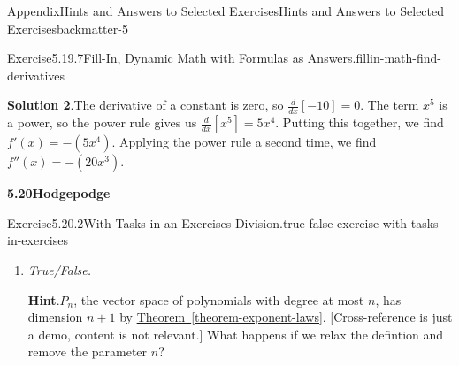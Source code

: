 \documentclass[oneside,10pt,]{book}
\newcommand{\blocktitlefont}{\relax}
\newcommand{\xreffont}{\relax}
\newlength{\fillinmaxwidth}
\newlength{\fillincontract}
\newlength{\charmaxwidth}\setlength{\charmaxwidth}{0.5em}
\newlength{\charminwidth}\setlength{\charminwidth}{0.1em}
\newlength{\fillinheight}
\newcommand{\fillintext}[1]{%
\setlength{\fillinmaxwidth}{#1\charmaxwidth}%
\setlength{\fillincontract}{#1\charminwidth}%
\setlength{\fillinheight}{\baselineskip}\addtolength{\fillinheight}{1.2pt}%
\strut\nobreak\leaders\vbox{\hrule width 0.3pt height 0.3pt \vskip -1.2pt}\hskip 1\fillinmaxwidth minus \fillincontract\nobreak\strut%
}
\newcommand{\lititle}[1]{{\slshape#1}}
\numberwithin{equation}{section}
\begin{document}
\begin{solutions-chapter}{Appendix}{Hints and Answers to Selected Exercises}{}{Hints and Answers to Selected Exercises}{}{}{backmatter-5}
\begin{divisionsolution}{Exercise}{5.19.7}{Fill-In, Dynamic Math with Formulas as Answers.}{fillin-math-find-derivatives}
\par\smallskip%
\noindent\textbf{\blocktitlefont Solution 2}.\hypertarget{fillin-math-find-derivatives-4-back}{}\quad{}The derivative of a constant is zero, so \(\frac{d}{dx}[-10]=0\). The term \(x^{5}\) is a power, so the power rule gives us \(\frac{d}{dx}[x^{5}]=5x^{4}\). Putting this together, we find \(f'(x)=-\left(5 x^{4}\right)\). Applying the power rule a second time, we find \(f''(x)=-\left(20 x^{3}\right)\).%
\end{divisionsolution}%
%
\par\medskip
\noindent\textbf{\Large{}5.20\space\textperiodcentered\space{}Hodgepodge}
\begin{divisionsolution}{Exercise}{5.20.2}{With Tasks in an Exercises Division.}{true-false-exercise-with-tasks-in-exercises}%
\begin{enumerate}[font=\bfseries,label=(\alph*),ref=\alph*]%
\item[(a)]\lititle{True\slash{}False.}\par%
\par\smallskip%
\noindent\textbf{\blocktitlefont Hint}.\hypertarget{true-false-task-in-exercises-4-back}{}\quad{}\(P_n\), the vector space of polynomials with degree at most \(n\), has dimension \(n+1\) by \hyperref[theorem-exponent-laws]{Theorem~{\xreffont\ref{theorem-exponent-laws}}}.  [Cross-reference is just a demo, content is not relevant.]  What happens if we relax the defintion and remove the parameter \(n\)?%

\end{enumerate}
\end{divisionsolution}
\end{solutions-chapter}
\end{document}

